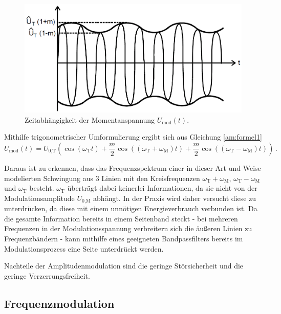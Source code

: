 \begin{figure}[!h]
    \centering
    \includegraphics[width=14cm]{images/am-amplitude.png}
    \caption{Zeitabhängigkeit der Momentanspannung $U_\text{mod}(t)$.}
    \label{am:amplitude}
\end{figure}

Mithilfe trigonometrischer Umformulierung ergibt sich aus Gleichung \eqref{am:formel1} 
\begin{equation}
     U_\text{mod}(t) = U_\text{0,T} \left( \cos{\left(\omega_\text{T} t\right)} + \frac{m}{2}\cos{\left((\omega_\text{T} + \omega_\text{M}) t\right)} + \frac{m}{2}\cos{\left((\omega_\text{T} - \omega_\text{M}) t\right)}\right) \,. \label{am:formel2}
\end{equation}

Daraus ist zu erkennen, dass das Frequenzspektrum einer in dieser Art und Weise modelierten Schwingung aus 3 Linien mit den Kreisfrequenzen $\omega_\text{T} + \omega_\text{M}$, $\omega_\text{T} - \omega_\text{M}$ und $\omega_\text{T}$ besteht.
$\omega_\text{T}$ überträgt dabei keinerlei Informationen, da sie nicht von der Modulationsamplitude $U_\text{0,M}$ abhängt.
In der Praxis wird daher versucht diese zu unterdrücken, da diese mit einem unnötigen Energieverbrauch verbunden ist.
Da die gesamte Information bereits in einem Seitenband steckt - bei mehreren Frequenzen in der Modulationsspannung verbreitern sich die äußeren Linien zu Frequenzbändern - kann mithilfe eines geeigneten Bandpassfilters bereits im Modulationsprozess eine Seite unterdrückt werden.

Nachteile der Amplitudenmodulation sind die geringe Störsicherheit und die geringe Verzerrungsfreiheit.

\subsection{Frequenzmodulation}
\label{subsec:einstein}

